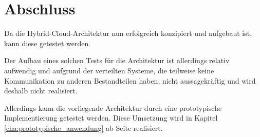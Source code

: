 \section{Abschluss}
Da die Hybrid-Cloud-Architektur nun erfolgreich konzipiert und aufgebaut ist, kann diese getestet werden.

Der Aufbau eines solchen Tests für die Architektur ist allerdings relativ aufwendig und aufgrund der verteilten Systeme,
die teilweise keine Kommunikation zu anderen Bestandteilen haben, nicht aussagekräftig und wird deshalb nicht realisiert.

Allerdings kann die vorliegende Architektur durch eine prototypische Implementierung getestet werden. Diese Umsetzung wird
in Kapitel \ref{cha:prototypische_anwendung} ab Seite \pageref{cha:prototypische_anwendung} realisiert.